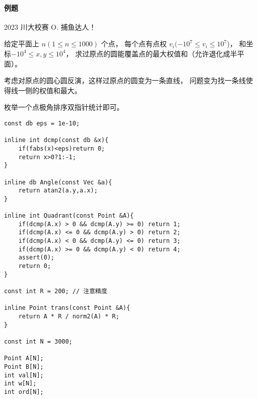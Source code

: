 \documentclass{ctexart}
\begin{document}
\paragraph{例题} 2023 川大校赛 O. 捕鱼达人！

给定平面上 $n(1\le n \le 1000)$ 个点，
每个点有点权 $v_i(-10^7 \le v_i \le 10^7$)，
和坐标$-10^4\le x, y\le 10^4$，
求过原点的圆能覆盖点的最大权值和（允许退化成半平面）。

考虑对原点的圆⼼圆反演，这样过原点的圆变为一条直线，
问题变为找一条线使得线一侧的权值和最大。

枚举一个点极角排序双指针统计即可。

\begin{lstlisting}
const db eps = 1e-10;

inline int dcmp(const db &x){
    if(fabs(x)<eps)return 0;
    return x>0?1:-1;
}

inline db Angle(const Vec &a){
	return atan2(a.y,a.x);
}

inline int Quadrant(const Point &A){
	if(dcmp(A.x) > 0 && dcmp(A.y) >= 0) return 1;
	if(dcmp(A.x) <= 0 && dcmp(A.y) > 0) return 2;
	if(dcmp(A.x) < 0 && dcmp(A.y) <= 0) return 3;
	if(dcmp(A.x) >= 0 && dcmp(A.y) < 0) return 4;
	assert(0);
	return 0;
}

const int R = 200; // 注意精度

inline Point trans(const Point &A){
	return A * R / norm2(A) * R;
}

const int N = 3000;

Point A[N];
Point B[N];
int val[N];
int w[N];
int ord[N];


\end{lstlisting}
\end{document}
